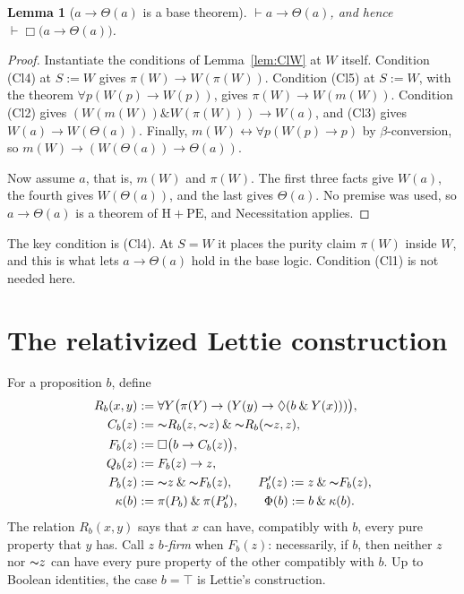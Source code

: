 \documentclass[12pt,leqno]{article}
\newcommand{\AND}{\ensuremath{\mathbin{\&}}}
\newcommand{\IFF}{\ensuremath{\leftrightarrow}}
\newcommand{\IC}{\ensuremath{\rightarrow}}
\newcommand{\NOT}{\ensuremath{\text{$\thicksim$}}}
\newcommand{\dentails}{\ensuremath{\vdash}}
\newcommand{\HPE}{\ensuremath{\mathrm{H}+\mathrm{PE}}}
\theoremstyle{plain}
\newtheorem{lemma}{Lemma}
\begin{document}
\begin{lemma}[\(a\IC\Theta(a)\) is a base theorem]\label{lem:base}
\(\dentails a\IC\Theta(a)\), and hence
\(\dentails\Box\bigl(a\IC\Theta(a)\bigr)\).
\end{lemma}
\begin{proof}
Instantiate the conditions of Lemma~\ref{lem:ClW} at \(W\) itself.
Condition (Cl4) at \(S:=W\) gives \(\pi(W)\IC W(\pi(W))\). Condition
(Cl5) at \(S:=W\), with the theorem \(\forall p(W(p)\IC W(p))\), gives
\(\pi(W)\IC W(m(W))\). Condition (Cl2) gives
\((W(m(W))\AND W(\pi(W)))\IC W(a)\), and (Cl3) gives
\(W(a)\IC W(\Theta(a))\). Finally, \(m(W)\IFF\forall p(W(p)\IC p)\) by
\(\beta\)-conversion, so \(m(W)\IC(W(\Theta(a))\IC\Theta(a))\).

Now assume \(a\), that is, \(m(W)\) and \(\pi(W)\). The first three
facts give \(W(a)\), the fourth gives \(W(\Theta(a))\), and the last
gives \(\Theta(a)\). No premise was used, so \(a\IC\Theta(a)\) is a
theorem of \HPE, and Necessitation applies.
\end{proof}

The key condition is (Cl4). At \(S=W\) it places the purity claim \(\pi(W)\)
inside \(W\), and this is what lets \(a\IC\Theta(a)\) hold in the base
logic. Condition (Cl1) is not needed here.

\section{The relativized Lettie construction}\label{sec:relative}

For a proposition \(b\), define
\begin{align}
 R_b(x,y)&:=\forall Y\bigl(\pi(Y)\IC(Y(y)\IC\Diamond(b\AND Y(x)))\bigr),
   \label{eq:Rb}\\
 C_b(z)&:=\NOT R_b(z,\NOT z)\AND\NOT R_b(\NOT z,z), \label{eq:Cb}\\
 F_b(z)&:=\Box\bigl(b\IC C_b(z)\bigr), \label{eq:Fb}\\
 Q_b(z)&:=F_b(z)\IC z, \label{eq:Qb}\\
 P_b(z)&:=\NOT z\AND\NOT F_b(z),\qquad P'_b(z):=z\AND\NOT F_b(z),
   \label{eq:Pb}\\
 \kappa(b)&:=\pi(P_b)\AND\pi(P'_b),\qquad
 \Phi(b):=b\AND\kappa(b). \label{eq:kappa}
\end{align}
The relation \(R_b(x,y)\) says that \(x\) can have, compatibly with
\(b\), every pure property that \(y\) has. Call \(z\)
\emph{\(b\)-firm} when \(F_b(z)\): necessarily, if \(b\), then neither
\(z\) nor \(\NOT z\) can have every pure property of the other
compatibly with \(b\). Up to Boolean identities, the case \(b=\top\) is
Lettie's construction.
\end{document}
